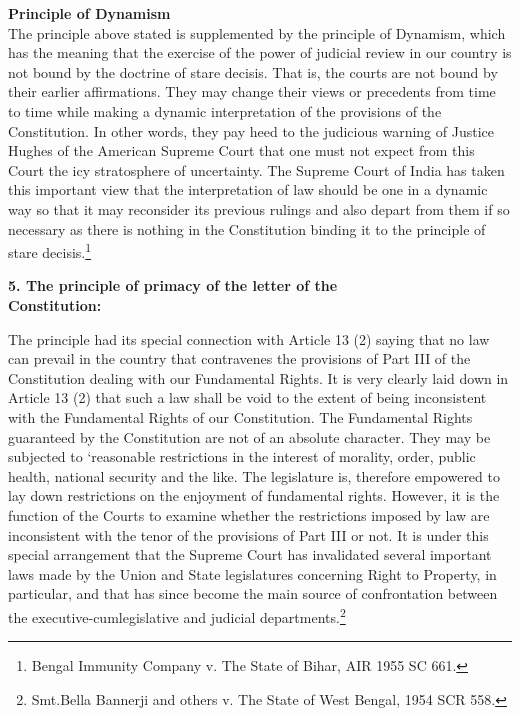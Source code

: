\begin{multicols}{2}
\noi
{\bf Principle of Dynamism}\\[0.2cm] The principle above stated is supplemented by the principle of Dynamism, which has
the meaning that the exercise of the power of judicial review in our country is not bound
by the doctrine of stare decisis. That is, the courts are not bound by their earlier
affirmations. They may change their views or precedents from time to time while
making a dynamic interpretation of the provisions of the Constitution. In other words,
they pay heed to the judicious warning of Justice Hughes of the American Supreme
Court that one must not expect from this Court the icy stratosphere of uncertainty. The
Supreme Court of India has taken this important view that the interpretation of law
should be one in a dynamic way so that it may reconsider its previous rulings and also
depart from them if so necessary as there is nothing in the Constitution binding it to the
principle of stare decisis.\footnote{Bengal Immunity Company v. The State of Bihar, AIR 1955 SC 661.}

\noi
{\bf 5. The principle of primacy of the letter of the\\ Constitution:}\\[0.2cm]

\vspace{-.6cm}

\noi
The principle had its special connection with Article 13 (2) saying that no law can
prevail in the country that contravenes the provisions of Part III of the Constitution
dealing with our Fundamental Rights. It is very clearly laid down in Article 13 (2) that
such a law shall be void to the extent of being inconsistent with the Fundamental Rights
of our Constitution. The Fundamental Rights guaranteed by the Constitution are not of
an absolute character. They may be subjected to ‘reasonable restrictions in the interest
of morality, order, public health, national security and the like. The legislature is,
therefore empowered to lay down restrictions on the enjoyment of fundamental rights.
However, it is the function of the Courts to examine whether the restrictions imposed
by law are inconsistent with the tenor of the provisions of Part III or not. It is under this
special arrangement that the Supreme Court has invalidated several important laws
made by the Union and State legislatures concerning Right to Property, in particular, and that has since become the main source of confrontation between the executive-cumlegislative and judicial departments.\footnote{Smt.Bella Bannerji and others v. The State of West Bengal, 1954 SCR 558.}


\end{multicols}
